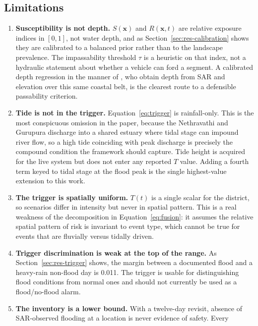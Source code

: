 \documentclass[11pt,a4paper]{article}
\newcommand{\Sx}{S(\mathbf{x})}
\newcommand{\Tt}{T(t)}
\newcommand{\Rxt}{R(\mathbf{x},t)}
\begin{document}
\subsection{Limitations}
\label{sec:limitations}
\begin{enumerate}
\itemsep2pt
\item \textbf{Susceptibility is not depth.} $\Sx$ and $\Rxt$ are relative
      exposure indices in $[0,1]$, not water depth, and as
      Section~\ref{sec:res-calibration} shows they are calibrated to a balanced
      prior rather than to the landscape prevalence. The impassability threshold
      $\tau$ is a heuristic on that index, not a hydraulic statement about
      whether a vehicle can ford a segment. A calibrated depth regression in the
      manner of \citet{sadhwani2026}, who obtain depth from SAR and elevation
      over this same coastal belt, is the clearest route to a defensible
      passability criterion.
\item \textbf{Tide is not in the trigger.} Equation~\eqref{eq:trigger} is
      rainfall-only. This is the most conspicuous omission in the paper, because
      the Nethravathi and Gurupura discharge into a shared estuary where tidal
      stage can impound river flow, so a high tide coinciding with peak discharge
      is precisely the compound condition the framework should capture. Tide
      height is acquired for the live system but does not enter any reported
      $T$ value. Adding a fourth term keyed to tidal stage at the flood peak is
      the single highest-value extension to this work.
\item \textbf{The trigger is spatially uniform.} $\Tt$ is a single scalar for the
      district, so scenarios differ in intensity but never in spatial pattern.
      This is a real weakness of the decomposition in
      Equation~\eqref{eq:fusion}: it assumes the relative spatial pattern of risk
      is invariant to event type, which cannot be true for events that are
      fluvially versus tidally driven.
\item \textbf{Trigger discrimination is weak at the top of the range.} As
      Section~\ref{sec:res-trigger} shows, the margin between a documented flood
      and a heavy-rain non-flood day is 0.011. The trigger is usable for
      distinguishing flood conditions from normal ones and should not currently
      be used as a flood/no-flood alarm.
\item \textbf{The inventory is a lower bound.} With a twelve-day revisit, absence
      of SAR-observed flooding at a location is never evidence of safety. Every

\end{enumerate}
\end{document}
